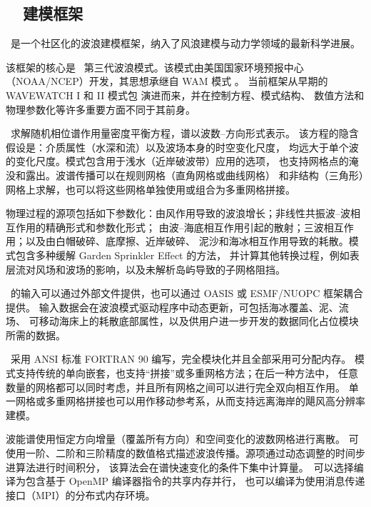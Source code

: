 \vssub
\subsection{~\ws\ 建模框架}
\vssub

\ww\ 是一个社区化的波浪建模框架，纳入了风浪建模与动力学领域的最新科学进展。

该框架的核心是 \ws\ 第三代波浪模式。该模式由美国国家环境预报中心
（NOAA/NCEP）开发，其思想承继自 WAM 模式 \citep{bk:WAM94}。
当前框架从早期的 WAVEWATCH I 和 II 模式包
\citep{tol:JPO91b, tol:JPO92} 演进而来，并在控制方程、模式结构、
数值方法和物理参数化等许多重要方面不同于其前身。

\ws\ 求解随机相位谱作用量密度平衡方程，谱以波数--方向形式表示。
该方程的隐含假设是：介质属性（水深和流）以及波场本身的时空变化尺度，
均远大于单个波的变化尺度。模式包含用于浅水（近岸破波带）应用的选项，
也支持网格点的淹没和露出。波谱传播可以在规则网格（直角网格或曲线网格）
和非结构（三角形）网格上求解，也可以将这些网格单独使用或组合为多重网格拼接。

物理过程的源项包括如下参数化：由风作用导致的波浪增长；非线性共振波--波相互作用的精确形式和参数化形式；
由波--海底相互作用引起的散射；三波相互作用；以及由白帽破碎、底摩擦、近岸破碎、
泥沙和海冰相互作用导致的耗散。模式包含多种缓解 Garden Sprinkler Effect 的方法，
并计算其他转换过程，例如表层流对风场和波场的影响，以及未解析岛屿导致的子网格阻挡。

\ws\ 的输入可以通过外部文件提供，也可以通过 OASIS 或 ESMF/NUOPC 框架耦合提供。
输入数据会在波浪模式驱动程序中动态更新，可包括海冰覆盖、泥、流场、
可移动海床上的耗散底部属性，以及供用户进一步开发的数据同化占位模块所需的数据。

\ws\ 采用 ANSI 标准 FORTRAN 90 编写，完全模块化并且全部采用可分配内存。
模式支持传统的单向嵌套，也支持“拼接”或多重网格方法；在后一种方法中，
任意数量的网格都可以同时考虑，并且所有网格之间可以进行完全双向相互作用。
单一网格或多重网格拼接也可以用作移动参考系，从而支持远离海岸的飓风高分辨率建模。

波能谱使用恒定方向增量（覆盖所有方向）和空间变化的波数网格进行离散。
可使用一阶、二阶和三阶精度的数值格式描述波浪传播。源项通过动态调整的时间步进算法进行时间积分，
该算法会在谱快速变化的条件下集中计算量。\ws\ 可以选择编译为包含基于 OpenMP 编译器指令的共享内存并行，
也可以编译为使用消息传递接口（MPI）的分布式内存环境。
